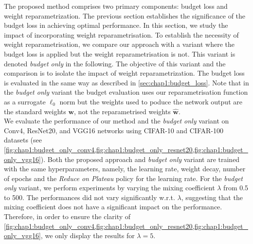 
The proposed method comprises two primary components: budget loss and weight
reparametrization. The previous section establishes the significance of the
budget loss in achieving optimal performance. In this section, we study the
impact of incorporating weight reparametrisation. To establish the necessity of
weight reparametrisation, we compare our approach with a variant where the
budget loss is applied but the weight reparametrisation is not. This variant is
denoted \emph{budget only} in the following. The objective of this variant and
the comparison is to isolate the impact of weight reparametrization. The budget
loss is evaluated in the same way as described in \cref{sec:chap1:budget_loss}.
Note that in the \emph{budget only} variant the budget evaluation uses our
reparametrisation function as a surrogate $\ell_0$ norm but the weights used to
poduce the network output are the standard weights $\mathbf{w}$, not the
reparametrised weights $\mathbf{\hat{w}}$.\\

We evaluate the performance of our method and the \emph{budget only} variant on
Conv4, ResNet20, and VGG16 networks using CIFAR-10 and CIFAR-100 datasets (see
\cref{fig:chap1:budget_only_conv4,fig:chap1:budget_only_resnet20,fig:chap1:budget_only_vgg16}).
Both the proposed approach and \emph{budget only} variant are trained with the
same hyperparameters, namely, the learning rate, weight decay, number of epochs
and the \emph{Reduce on Plateau} policy for the learning rate. For the
\textit{budget only} variant,  we perform experiments by varying the mixing
coefficient $\lambda$ from 0.5 to 500. The performances did not vary
significantly w.r.t. $\lambda$, suggesting that the mixing coefficient does not
have a significant impact on the performance. Therefore, in order to ensure the
clarity of
\cref{fig:chap1:budget_only_conv4,fig:chap1:budget_only_resnet20,fig:chap1:budget_only_vgg16},
we only display the results for $\lambda = 5$.\\


